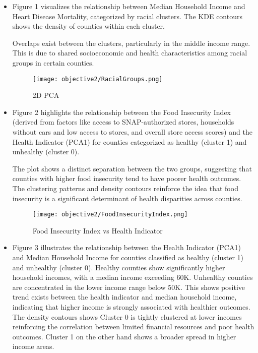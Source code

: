 \documentclass{article}
\begin{document}
\begin{itemize}[leftmargin=0pt]
\begin{tabular}{|c|c|c|c|c|c|c|}
\end{tabular}

\item[]
Figure 1 visualizes the relationship between Median Household Income and Heart Disease Mortality, categorized by racial clusters. The KDE contours shows the density of counties within each cluster.

Overlaps exist between the clusters, particularly in the middle income range. This is due to shared socioeconomic and health characteristics among racial groups in certain counties.

\begin{figure}[h]
    \centering
    \texttt{[image: objective2/RacialGroups.png]}
    \caption{2D PCA}
    \label{fig:PCA}
\end{figure}

\item[]
Figure 2 highlights the relationship between the Food Insecurity Index (derived from factors like access to SNAP-authorized stores, households without cars and low access to stores, and overall store access scores) and the Health Indicator (PCA1) for counties categorized as healthy (cluster 1) and unhealthy (cluster 0).

The plot shows a distinct separation between the two groups, suggesting that counties with higher food insecurity tend to have poorer health outcomes. The clustering patterns and density contours reinforce the idea that food insecurity is a significant determinant of health disparities across counties.

\begin{figure}[h]
    \centering
    \texttt{[image: objective2/FoodInsecurityIndex.png]}
    \caption{Food Insecurity Index vs Health Indicator}
    \label{fig:food}
\end{figure}

\item[]
Figure 3 illustrates the relationship between the Health Indicator (PCA1) and Median Household Income for counties classified as healthy (cluster 1) and unhealthy (cluster 0). Healthy counties show significantly higher household incomes, with a median income exceeding 60K. Unhealthy counties are concentrated in the lower income range below 50K. This shows positive trend exists between the health indicator and median household income, indicating that higher income is strongly associated with healthier outcomes. The density contours shows Cluster 0 is tightly clustered at lower incomes reinforcing the correlation between limited financial resources and poor health outcomes. Cluster 1 on the other hand shows a broader spread in higher income areas.


\end{itemize}
\end{document}
